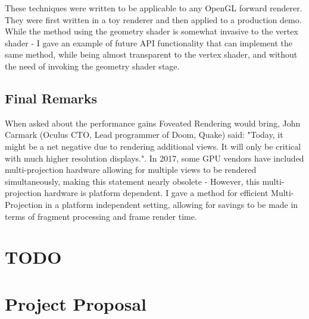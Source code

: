\documentclass[12pt,a4paper,twoside,openright]{report}
\begin{document}
These techniques were written to be applicable to any OpenGL forward renderer. They were first written in a toy renderer and then applied to a production demo.
While the method using the geometry shader is somewhat invasive to the vertex shader - I gave an example of future API functionality that can implement the same method, while being almost transparent to the vertex shader, and without the need of invoking the geometry shader stage.

\section{Final Remarks}

When asked about the performance gains Foveated Rendering would bring, John Carmark (Oculus CTO, Lead programmer of Doom, Quake) said: "Today, it might be a net negative due to rendering additional views. It will only be critical with much higher resolution displays.". In 2017, some GPU vendors have included multi-projection hardware allowing for multiple views to be rendered simultaneously, making this statement nearly obsolete - However, this multi-projection hardware is platform dependent. I gave a method for efficient Multi-Projection in a platform independent setting, allowing for savings to be made in terms of fragment processing and frame render time.



\appendix
\chapter{TODO}

\chapter{Project Proposal}


\end{document}
